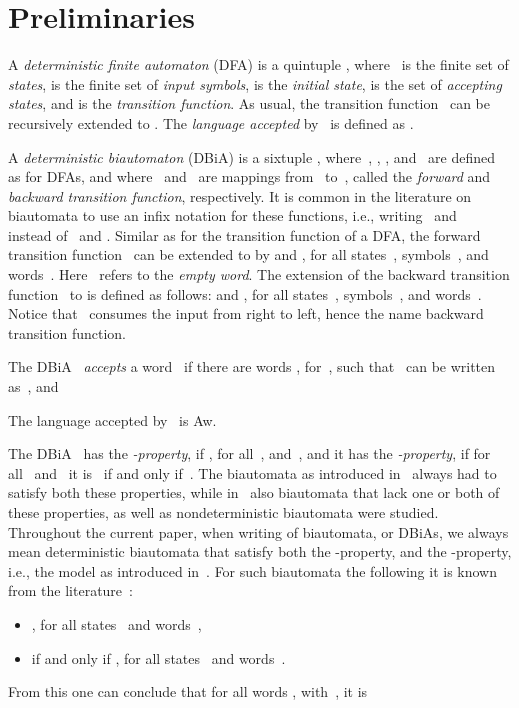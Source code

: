 \documentclass[submission]{eptcs}
\newcommand{\dfa}{\textrm{DFA}}
\newcommand{\dbia}{\textrm{DBiA}}
\begin{document}
\section{Preliminaries}
\label{sec:preliminaries}

A \emph{deterministic finite automaton} (\dfa) is a quintuple
, where~ is the finite set of
\emph{states},  is the finite set of \emph{input symbols},
 is the \emph{initial state},  is the set of
\emph{accepting states}, and  is the
\emph{transition function}.  As usual, the transition
function~ can be recursively extended to .  The \emph{language accepted} by~ is defined
as .

A \emph{deterministic biautomaton} (\dbia) is a sixtuple
, where~, , , and~
are defined as for \dfa s, and where~ and~ are mappings
from~ to~, called the \emph{forward} and
\emph{backward transition function}, respectively.  It is common in
the literature on biautomata to use an infix notation for these
functions, i.e., writing~ and~ instead
of~ and .  Similar as for the transition
function of a \dfa, the forward transition function~ can be
extended to  by 
 and ,
for all states~, symbols~, and
words~. Here~ refers to the \emph{empty
  word}. The extension of the backward transition function~ to
 is defined as follows:
 and , 
for all states~, symbols~, and
words~.  Notice that~ consumes the input from
right to left, hence the name backward transition function.

The \dbia~ \emph{accepts} a word~ if there are
words , for~, such that~ can be
written as~, and

The language accepted by~ is Aw.

The \dbia~ has the \emph{-property}, if , for all~, and~, and it
has the \emph{-property}, if for all~ and~ it
is~ if and only if~.
The biautomata as introduced in~\cite{KlPo12} always had to satisfy
both these properties, while in~\cite{HoJa13c,HoJa13a} also biautomata
that lack one or both of these properties, as well as nondeterministic
biautomata were studied.
Throughout the current paper, when writing of biautomata, or \dbia s,
we always mean deterministic biautomata that satisfy both the
-property, and the -property, i.e., the model as
introduced in~\cite{KlPo12}.
For such biautomata the following it is known from the
literature~\cite{HoJa13c,KlPo12}:
\begin{itemize}
\item , for all states~
  and words~,
\item  if and only if , for all states~ and words~.
\end{itemize}
From this one can conclude that for all words ,
with~, it is 
\end{document}
